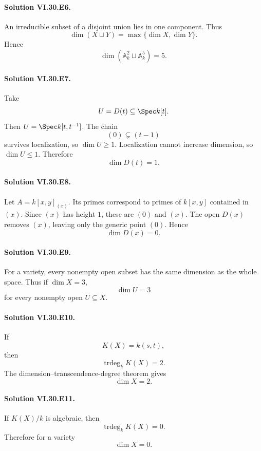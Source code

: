 \paragraph{Solution VI.30.E6.}
An irreducible subset of a disjoint union lies in one component. Thus
\[
\dim(X\sqcup Y)=\max\{\dim X,\dim Y\}.
\]
Hence
\[
\boxed{\dim(\mathbb A^2_k\sqcup\mathbb A^5_k)=5}.
\]

\paragraph{Solution VI.30.E7.}
Take
\[
U=D(t)\subseteq\Spec k[t].
\]
Then \(U=\Spec k[t,t^{-1}]\). The chain
\[
(0)\subsetneq(t-1)
\]
survives localization, so \(\dim U\ge1\). Localization cannot increase dimension, so \(\dim U\le1\).
Therefore
\[
\boxed{\dim D(t)=1}.
\]

\paragraph{Solution VI.30.E8.}
Let \(A=k[x,y]_{(x)}\). Its primes correspond to primes of \(k[x,y]\) contained in \((x)\).
Since \((x)\) has height \(1\), these are \((0)\) and \((x)\). The open \(D(x)\) removes \((x)\),
leaving only the generic point \((0)\). Hence
\[
\boxed{\dim D(x)=0}.
\]

\paragraph{Solution VI.30.E9.}
For a variety, every nonempty open subset has the same dimension as the whole space. Thus if
\(\dim X=3\),
\[
\boxed{\dim U=3}
\]
for every nonempty open \(U\subseteq X\).

\paragraph{Solution VI.30.E10.}
If
\[
K(X)=k(s,t),
\]
then
\[
\operatorname{trdeg}_kK(X)=2.
\]
The dimension--transcendence-degree theorem gives
\[
\boxed{\dim X=2}.
\]

\paragraph{Solution VI.30.E11.}
If \(K(X)/k\) is algebraic, then
\[
\operatorname{trdeg}_kK(X)=0.
\]
Therefore for a variety
\[
\boxed{\dim X=0}.
\]

